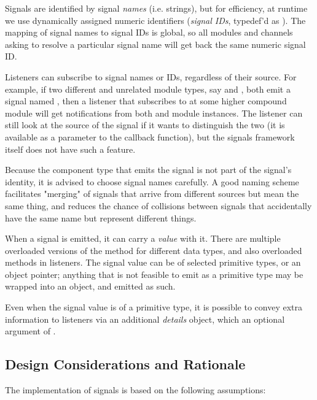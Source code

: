 \begin{ned}
Signals are identified by signal \textit{names} (i.e. strings), but for efficiency,
at runtime we use dynamically assigned numeric identifiers (\textit{signal IDs},
typedef'd as ). The mapping of signal names to signal IDs is
global, so all modules and channels asking to resolve a particular signal name
will get back the same numeric signal ID.

Listeners can subscribe to signal names or IDs, regardless of their
source. For example, if two different and unrelated module types, say
 and , both emit a signal named , then
a listener that subscribes to  at some higher compound module
will get notifications from both  and  module
instances. The listener can still look at the source of the signal if it
wants to distinguish the two (it is available as a parameter to the
callback function), but the signals framework itself does not have such a
feature.

\begin{note}
  Because the component type that emits the signal is not part of the signal's
  identity, it is advised to choose signal names carefully. A good naming scheme
  facilitates "merging" of signals that arrive from different sources but
  mean the same thing, and reduces the chance of collisions between signals that
  accidentally have the same name but represent different things.
\end{note}

When a signal is emitted, it can carry a \textit{value} with it. There are
multiple overloaded versions of the  method for different
data types, and also overloaded  methods in
listeners. The signal value can be of selected primitive types, or an
object pointer; anything that is not feasible to emit as a primitive type
may be wrapped into an object, and emitted as such.

Even when the signal value is of a primitive type, it is possible to convey
extra information to listeners via an additional \textit{details} object,
which an optional argument of .


\subsection{Design Considerations and Rationale}
\label{sec:simple-modules:signals-design}

The implementation of signals is based on the following assumptions:


\end{ned}
